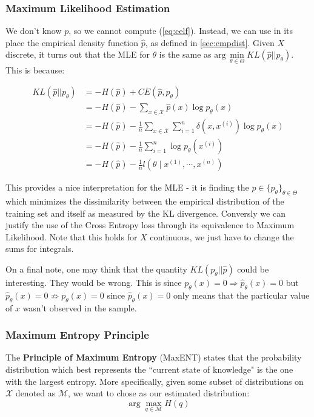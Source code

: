 \documentclass[]{article}
\theoremstyle{mattstyle}
\theoremstyle{definition}
\begin{document}
\newpage

\subsubsection{Maximum Likelihood Estimation}

We don't know $p$, so we cannot compute (\ref{eq:celf}). Instead, we can use in its place the empirical density function $\hat{p}$, as defined in \ref{sec:empdist}. Given $X$ discrete, it turns out that the MLE for $\theta$ is the same as $\text{arg}\,\min\limits_{\theta\in\Theta} KL(\hat{p}||p_{\theta})$. This is because:

\begin{align*}
KL(\hat{p}||p_{\theta}) &= -H(\hat{p}) + CE(\hat{p},p_{\theta}) \\
&= -H(\hat{p}) - \sum_{x\in\mathcal{X}}\hat{p}(x)\log p_{\theta}(x)\\
&= -H(\hat{p}) - \frac{1}{n}\sum_{x\in\mathcal{X}}\sum_{i=1}^n\delta(x,x^{(i)}) \log p_{\theta}(x)\\
&= -H(\hat{p}) - \frac{1}{n}\sum_{i=1}^n\log p_{\theta}(x^{(i)})\\
&= -H(\hat{p}) - \frac{1}{n}l(\theta \mid x^{(1)}, \cdots, x^{(n)})
\end{align*}

This provides a nice interpretation for the MLE - it is finding the $p\in \{p_{\theta}\}_{\theta\in\Theta}$ which minimizes the dissimilarity between the empirical distribution of the training set and itself as measured by the KL divergence. Conversly we can justify the use of the Cross Entropy loss through its equivalence to Maximum Likelihood. Note that this holds for $X$ continuous, we just have to change the sums for integrals.

On a final note, one may think that the quantity $KL(p_{\theta}|| \hat{p})$ could be interesting. They would be wrong. This is since $p_{\theta}(x)=0 \Rightarrow \hat{p}_{\theta}(x)=0$ but $\hat{p}_{\theta}(x)=0 \not\Rightarrow p_{\theta}(x)=0$ since $\hat{p}_{\theta}(x)=0$ only means that the particular value of $x$ wasn't observed in the sample.	


\subsubsection{Maximum Entropy Principle}

The \textbf{Principle of Maximum Entropy} (MaxENT) states that the probability distribution which best represents the ``current state of knowledge" is the one with the largest entropy. More specifically, given some subset of distributions on $\mathcal{X}$ denoted as $\mathcal{M}$, we want to chose as our estimated distribution:
$$\arg\max\limits_{q \in \mathcal{M}} H(q)$$
\end{document}
